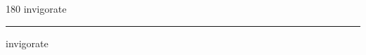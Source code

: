 
\begin{frame}
\begin{center}
\begin{turn}{180}
{\fontsize{2.5cm}{1em}\selectfont invigorate}
\end{turn}
\vspace{1em}\par  
\hrule
\vspace{1em}\par  
{\fontsize{2.5cm}{1em}\selectfont invigorate}
\end{center}
\end{frame}
